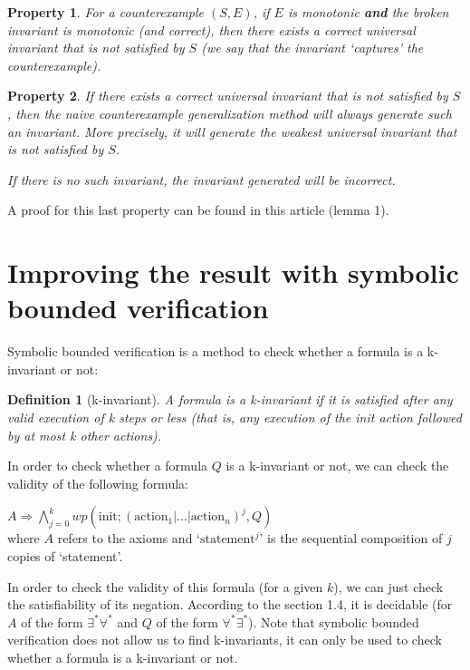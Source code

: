 \documentclass[11pt,a4paper,oldfontcommands,openany]{memoir}
\newtheorem*{definition}{Definition}
\newtheorem*{property}{Property}
\begin{document}
    \begin{property}
        For a counterexample \((S,E)\), if \(E\) is monotonic \textbf{and} the broken invariant is monotonic (and correct),
        then there exists a correct universal invariant that is not satisfied by \(S\) (we say that the invariant `captures' the counterexample).
    \end{property}
    \begin{property}
        If there exists a correct universal invariant that is not satisfied by \(S\), then
        the naive counterexample generalization method will always generate such an invariant.
        More precisely, it will generate the weakest universal invariant that is not satisfied by \(S\).

        If there is no such invariant, the invariant generated will be incorrect.
    \end{property}
    
    A proof for this last property can be found in this\cite{Karbyshev:2017:PIU:3065931.3022187} article (lemma 1).

    \section{Improving the result with symbolic bounded verification}

    Symbolic bounded verification is a method to check whether a formula is a k-invariant or not:

    \begin{definition}[k-invariant]
        A formula is a k-invariant if it is satisfied after any valid execution of k steps or less
        (that is, any execution of the init action followed by at most k other actions).
    \end{definition}
    
    In order to check whether a formula \(Q\) is a k-invariant or not, we can check the validity of the following formula:

    \( A \Rightarrow \bigwedge\limits_{j=0}^k wp(\text{init}; (\text{action}_1|\ldots|\text{action}_n)^j, Q) \)\\
    where \(A\) refers to the axioms and `\(\text{statement}^j\)' is the sequential composition of \(j\) copies of `statement'.

    In order to check the validity of this formula (for a given \(k\)), we can just check the satisfiability of its negation.
    According to the section 1.4, it is decidable (for \(A\) of the form \(\exists^*\forall^*\) and \(Q\) of the form \(\forall^*\exists^*\)).
    Note that symbolic bounded verification does not allow us to find k-invariants, it can only be used to check whether a formula is a k-invariant or not.
\end{document}

